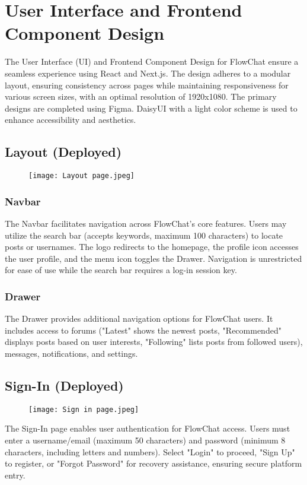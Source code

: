 \documentclass[11pt, a4paper]{article}
\begin{document}
\section{User Interface and Frontend Component Design}
The User Interface (UI) and Frontend Component Design for FlowChat ensure a seamless experience using React and Next.js. The design adheres to a modular layout, ensuring consistency across pages while maintaining responsiveness for various screen sizes, with an optimal resolution of 1920x1080. The primary designs are completed using Figma. DaisyUI with a light color scheme is used to enhance accessibility and aesthetics.

\subsection{Layout (Deployed)}

\begin{figure}[H]
    \centering
    \texttt{[image: Layout page.jpeg]}
    \label{fig:drawer_layout}
\end{figure}

\subsubsection{Navbar}
The Navbar facilitates navigation across FlowChat’s core features. Users may utilize the search bar (accepts keywords, maximum 100 characters) to locate posts or usernames. The logo redirects to the homepage, the profile icon accesses the user profile, and the menu icon toggles the Drawer. Navigation is unrestricted for ease of use while the search bar requires a log-in session key.

\subsubsection{Drawer}
The Drawer provides additional navigation options for FlowChat users. It includes access to forums ("Latest" shows the newest posts, "Recommended" displays posts based on user interests, "Following" lists posts from followed users), messages, notifications, and settings.

\subsection{Sign-In (Deployed)}
\begin{figure}[H]
    \centering
    \texttt{[image: Sign in page.jpeg]}
    \label{fig:Sign-In Component Layout}
\end{figure}
The Sign-In page enables user authentication for FlowChat access. Users must enter a username/email (maximum 50 characters) and password (minimum 8 characters, including letters and numbers). Select "Login" to proceed, "Sign Up" to register, or "Forgot Password" for recovery assistance, ensuring secure platform entry.
\end{document}
